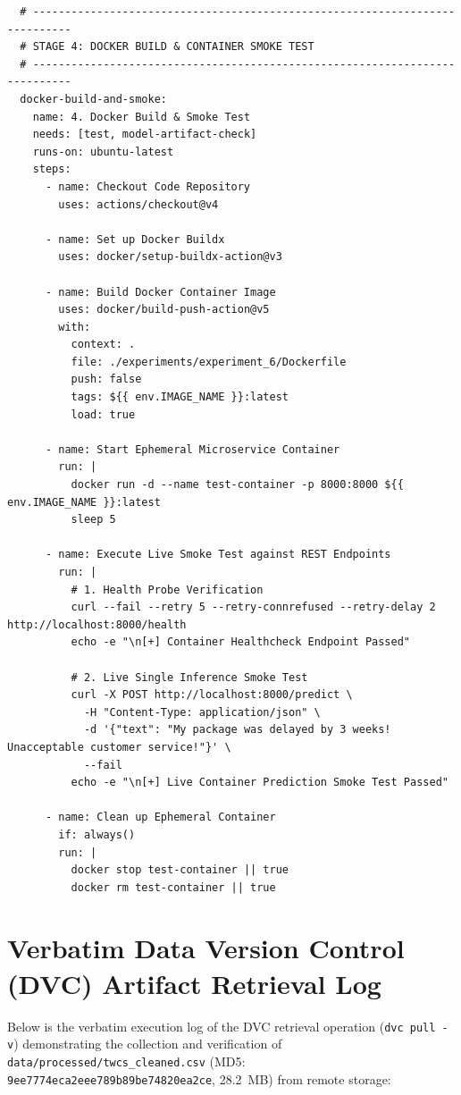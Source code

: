 \documentclass[11pt, a4paper]{article}
\begin{document}
\begin{footnotesize}
\begin{verbatim}
  # ----------------------------------------------------------------------------
  # STAGE 4: DOCKER BUILD & CONTAINER SMOKE TEST
  # ----------------------------------------------------------------------------
  docker-build-and-smoke:
    name: 4. Docker Build & Smoke Test
    needs: [test, model-artifact-check]
    runs-on: ubuntu-latest
    steps:
      - name: Checkout Code Repository
        uses: actions/checkout@v4

      - name: Set up Docker Buildx
        uses: docker/setup-buildx-action@v3

      - name: Build Docker Container Image
        uses: docker/build-push-action@v5
        with:
          context: .
          file: ./experiments/experiment_6/Dockerfile
          push: false
          tags: ${{ env.IMAGE_NAME }}:latest
          load: true

      - name: Start Ephemeral Microservice Container
        run: |
          docker run -d --name test-container -p 8000:8000 ${{ env.IMAGE_NAME }}:latest
          sleep 5

      - name: Execute Live Smoke Test against REST Endpoints
        run: |
          # 1. Health Probe Verification
          curl --fail --retry 5 --retry-connrefused --retry-delay 2 http://localhost:8000/health
          echo -e "\n[+] Container Healthcheck Endpoint Passed"

          # 2. Live Single Inference Smoke Test
          curl -X POST http://localhost:8000/predict \
            -H "Content-Type: application/json" \
            -d '{"text": "My package was delayed by 3 weeks! Unacceptable customer service!"}' \
            --fail
          echo -e "\n[+] Live Container Prediction Smoke Test Passed"

      - name: Clean up Ephemeral Container
        if: always()
        run: |
          docker stop test-container || true
          docker rm test-container || true

\end{verbatim}
\end{footnotesize}

\clearpage
\section{Verbatim Data Version Control (DVC) Artifact Retrieval Log}
\label{app:dvc_log}
Below is the verbatim execution log of the DVC retrieval operation (\texttt{dvc pull -v}) demonstrating the collection and verification of \texttt{data/processed/twcs\_cleaned.csv} (MD5: \texttt{9ee7774eca2eee789b89be74820ea2ce}, 28.2~MB) from remote storage:
\end{document}
